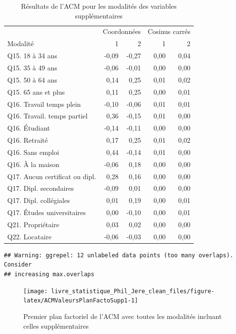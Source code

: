 \documentclass[
  11pt,
  french,
]{book}
\begin{document}
\begin{table}

\caption{\label{tab:ACMValeursCoordSupplTab}Résultats de l'ACM pour les modalités des variables supplémentaires}
\centering
\fontsize{8}{10}\selectfont
\begin{tabular}[t]{lrrrr}
\toprule
\multicolumn{1}{c}{ } & \multicolumn{2}{c}{Coordonnées} & \multicolumn{2}{c}{Cosinus carrés} \\
\cmidrule(l{3pt}r{3pt}){2-3} \cmidrule(l{3pt}r{3pt}){4-5}
Modalité & 1 & 2 & 1 & 2\\
\midrule
Q15. 18 à 34 ans & -0,09 & -0,27 & 0,00 & 0,04\\
Q15. 35 à 49 ans & -0,06 & -0,01 & 0,00 & 0,00\\
Q15. 50 à 64 ans & 0,14 & 0,25 & 0,01 & 0,02\\
Q15. 65 ans et plus & 0,11 & 0,25 & 0,00 & 0,01\\
Q16. Travail temps plein & -0,10 & -0,06 & 0,01 & 0,01\\
\addlinespace
Q16. Travail. temps partiel & 0,36 & -0,15 & 0,01 & 0,00\\
Q16. Étudiant & -0,14 & -0,11 & 0,00 & 0,00\\
Q16. Retraité & 0,17 & 0,25 & 0,01 & 0,02\\
Q16. Sans emploi & 0,44 & -0,14 & 0,01 & 0,00\\
Q16. À la maison & -0,06 & 0,18 & 0,00 & 0,00\\
\addlinespace
Q17. Aucun certificat ou dipl. & 0,28 & 0,16 & 0,00 & 0,00\\
Q17. Dipl. secondaires & -0,09 & 0,01 & 0,00 & 0,00\\
Q17. Dipl. collégiales & 0,01 & 0,19 & 0,00 & 0,01\\
Q17. Études universitaires & 0,00 & -0,10 & 0,00 & 0,01\\
Q21. Propriétaire & 0,03 & 0,02 & 0,00 & 0,00\\
\addlinespace
Q22. Locataire & -0,06 & -0,03 & 0,00 & 0,00\\
\bottomrule
\end{tabular}
\end{table}

\begin{verbatim}
## Warning: ggrepel: 12 unlabeled data points (too many overlaps). Consider
## increasing max.overlaps
\end{verbatim}

\begin{figure}

{\centering \texttt{[image: livre\_statistique\_Phil\_Jere\_clean\_files/figure-latex/ACMValeursPlanFactoSupp1-1]} 

}

\caption{Premier plan factoriel de l'ACM avec toutes les modalités incluant celles supplémentaires}\label{fig:ACMValeursPlanFactoSupp1}
\end{figure}
\end{document}
